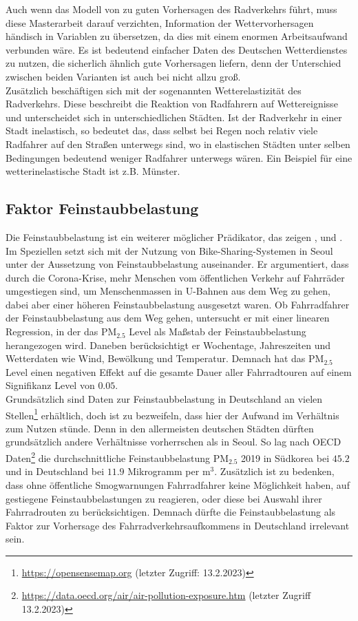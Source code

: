\documentclass[a4paper,12pt]{thesis}
\begin{document}
Auch wenn das Modell von \cite{Wessel2020} zu guten Vorhersagen des Radverkehrs führt, muss diese Masterarbeit darauf verzichten, Information der Wettervorhersagen händisch in Variablen zu übersetzen, da dies mit einem enormen Arbeitsaufwand verbunden wäre. Es ist bedeutend einfacher Daten des Deutschen Wetterdienstes zu nutzen, die sicherlich ähnlich gute Vorhersagen liefern, denn der Unterschied zwischen beiden Varianten ist auch bei \cite{Wessel2020} nicht allzu groß.\\
Zusätzlich beschäftigen sich \cite{Goldmann2021} mit der sogenannten Wetterelastizität des Radverkehrs. Diese beschreibt die Reaktion von Radfahrern auf Wettereignisse und unterscheidet sich in unterschiedlichen Städten. Ist der Radverkehr in einer Stadt inelastisch, so bedeutet das, dass selbst bei Regen noch relativ viele Radfahrer auf den Straßen unterwegs sind, wo in elastischen Städten unter selben Bedingungen bedeutend weniger Radfahrer unterwegs wären. Ein Beispiel für eine wetterinelastische Stadt ist z.B. Münster.


\subsection{Faktor Feinstaubbelastung}

Die Feinstaubbelastung ist ein weiterer möglicher Prädikator, das zeigen \cite{ZHAO2018826}, \cite{Gao2022} und \cite{Hong2022}. Im Speziellen setzt sich \cite{Hong2022} mit der Nutzung von Bike-Sharing-Systemen in Seoul unter der Aussetzung von Feinstaubbelastung auseinander. Er argumentiert, dass durch die Corona-Krise, mehr Menschen vom öffentlichen Verkehr auf Fahrräder umgestiegen sind, um Menschenmassen in U-Bahnen aus dem Weg zu gehen, dabei aber einer höheren Feinstaubbelastung ausgesetzt waren. Ob Fahrradfahrer der Feinstaubbelastung aus dem Weg gehen, untersucht er mit einer linearen Regression, in der das PM$_{2.5}$ Level als Maßstab der Feinstaubbelastung herangezogen wird. Daneben berücksichtigt er Wochentage, Jahreszeiten und Wetterdaten wie Wind, Bewölkung und Temperatur. Demnach hat das PM$_{2.5}$ Level einen negativen Effekt auf die gesamte Dauer aller Fahrradtouren auf einem Signifikanz Level von $0.05$.\\
Grundsätzlich sind Daten zur Feinstaubbelastung in Deutschland an vielen Stellen\footnote{\url{https://opensensemap.org} (letzter Zugriff: 13.2.2023)} erhältlich, doch ist zu bezweifeln, dass hier der Aufwand im Verhältnis zum Nutzen stünde. Denn in den allermeisten deutschen Städten dürften grundsätzlich andere Verhältnisse vorherrschen als in Seoul. So lag nach OECD Daten\footnote{\url{https://data.oecd.org/air/air-pollution-exposure.htm} (letzter Zugriff 13.2.2023)} die durchschnittliche Feinstaubbelastung PM$_{2.5}$ 2019 in Südkorea bei $45.2$ und in Deutschland bei $11.9$ Mikrogramm per m$^3$. Zusätzlich ist zu bedenken, dass ohne öffentliche Smogwarnungen Fahrradfahrer keine Möglichkeit haben, auf gestiegene Feinstaubbelastungen zu reagieren, oder diese bei Auswahl ihrer Fahrradrouten zu berücksichtigen. Demnach dürfte die Feinstaubbelastung als Faktor zur Vorhersage des Fahrradverkehrsaufkommens in Deutschland irrelevant sein.
\end{document}
